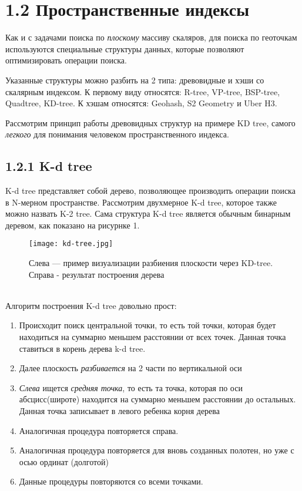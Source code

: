
\section{1.2 Пространственные индексы}
Как и с задачами поиска по \textit{плоскому} массиву скаляров, для поиска по геоточкам используются специальные структуры данных, которые позволяют оптимизировать операции поиска. 

Указанные структуры можно разбить на 2 типа: древовидные и хэши со скалярным индексом. К первому виду относятся: R-tree, VP-tree, BSP-tree, Quadtree, KD-tree. К хэшам относятся: Geohash, S2 Geometry и Uber H3.

Рассмотрим принцип работы древовидных структур на примере KD tree, самого \textit{легкого} для понимания человеком пространственного индекса.

\subsection{1.2.1 K-d tree}
K-d tree представляет собой дерево, позволяющее производить операции поиска в N-мерном пространстве. Рассмотрим двухмерное K-d tree, которое также можно назвать K-2 tree.
Сама структура K-d tree является обычным бинарным деревом, как показано на рисурнке 1.
  \\
\begin{figure}[h]
    \centering
    \texttt{[image: kd-tree.jpg]}
    \caption{Слева — пример визуализации разбиения плоскости через KD-tree. Справа - результат построения дерева}
\end{figure}
  \\
Алгоритм построения K-d tree довольно прост\cite{nnq}:
\begin{enumerate}
    \item Происходит поиск центральной точки, то есть той точки, которая будет находиться на суммарно меньшем расстоянии от всех точек. Данная точка ставиться в корень дерева k-d tree.
    \item Далее плоскость \textit{разбивается} на 2 части по вертикальной оси
    \item \textit{Слева} ищется \textit{средняя точка}, то есть та точка, которая по оси абсцисс(широте) находится на суммарно меньшем расстоянии до остальных. Данная точка записывает в левого ребенка корня дерева
    \item Аналогичная процедура повторяется справа.
    \item Аналогичная процедура повторяется для вновь созданных полотен, но уже с осью ординат (долготой)
    \item Данные процедуры повторяются со всеми точками.
\end{enumerate}

